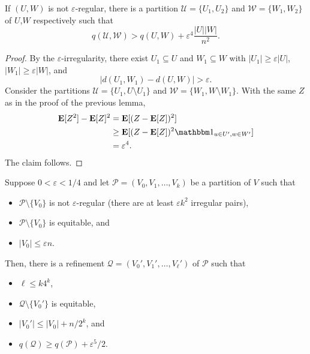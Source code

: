 			\begin{lemma}
				\label{lemma: szemeredi lemma energy increases for irregular}
				If $(U,W)$ is not $\varepsilon$-regular, there is a partition $\mathcal{U} = \{U_1,U_2\}$ and $\mathcal{W} = \{W_1,W_2\}$ of $U$,$W$ respectively such that
				\[ q(\mathcal{U},\mathcal{W}) > q(U,W) + \varepsilon^4 \frac{|U||W|}{n^2}. \]
			\end{lemma}
			\begin{proof}
				By the $\varepsilon$-irregularity, there exist $U_1\subseteq U$ and $W_1\subseteq W$ with $|U_1| \ge \varepsilon|U|$, $|W_1| \ge \varepsilon|W|$, and
				\[ |d(U_1,W_1) - d(U,W)| > \varepsilon. \]
				Consider the partitions $\mathcal{U} = \{U_1,U\setminus U_1\}$ and $\mathcal{W} = \{W_1,W\setminus W_1\}$. With the same $Z$ as in the proof of the previous lemma,
				\begin{align*}
					\expec[Z^2] - \expec[Z]^2 &= \expec[(Z - \expec[Z])^2] \\
						&\ge \expec[(Z - \expec[Z])^2 \indic_{u\in U', w\in W'}] \\
						&= \varepsilon^4.
				\end{align*}
				The claim follows.
			\end{proof}

			\begin{flem}
				\label{lemma: final step of szemeredi's regularity lemma}
				Suppose $0 < \varepsilon < 1/4$ and let $\mathcal{P} = (V_0,V_1,\ldots,V_k)$ be a partition of $V$ such that
				\begin{itemize}
				 	\item $\mathcal{P} \setminus \{V_0\}$ is not $\varepsilon$-regular (there are at least $\varepsilon k^2$ irregular pairs),
				 	\item $\mathcal{P} \setminus \{V_0\}$ is equitable\footnotemark, and
				 	\item $|V_0| \le \varepsilon n$.
				\end{itemize}
				Then, there is a refinement $\mathcal{Q} = (V_0',V_1',\ldots,V_\ell')$ of $\mathcal{P}$ such that
				\begin{itemize}
					\item $\ell \le k 4^k$,
					\item $\mathcal{Q} \setminus \{V_0'\}$ is equitable,
					\item $|V_0'| \le |V_0| + n / 2^k$, and
					\item $q(\mathcal{Q}) \ge q(\mathcal{P}) + \varepsilon^5/2$.
				\end{itemize}
			\end{flem}

